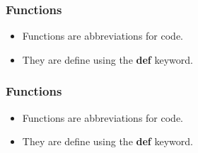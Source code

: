 \documentclass[]{beamer}
\begin{document}

\begin{frame}
\frametitle{Functions}

\begin{itemize}
\item Functions are abbreviations for code.
\item They are define using the \textbf{def} keyword.
\end{itemize}

\begin{block}{}

\end{block}

\end{frame}


\begin{frame}
\frametitle{Functions}

\begin{itemize}
\item Functions are abbreviations for code.
\item They are define using the \textbf{def} keyword.
\end{itemize}

\begin{block}{}

\end{block}

\end{frame}

\end{document}
